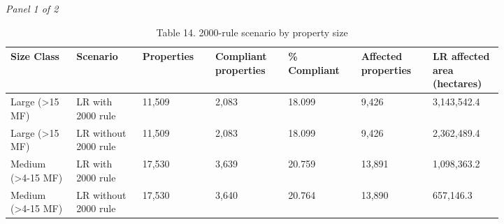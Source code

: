 \documentclass[12pt]{article}
\begin{document}
\begin{landscape}
\begin{table}[H]
\centering
\caption{Table 14. 2000-rule scenario by property size}
\textit{Panel 1 of 2}\\[2pt]
{\fontsize{12}{14}\selectfont
\setlength{\tabcolsep}{3pt}
\renewcommand{\arraystretch}{1.08}
\begin{tabular}{p{0.117\linewidth}p{0.117\linewidth}p{0.117\linewidth}p{0.117\linewidth}p{0.117\linewidth}p{0.117\linewidth}p{0.117\linewidth}}
\toprule
Size Class & Scenario & Properties & Compliant properties & \% Compliant & Affected properties & LR affected area (hectares) \\
\midrule
Large (>15 MF) & LR with 2000 rule & 11,509 & 2,083 & 18.099 & 9,426 & 3,143,542.4 \\
Large (>15 MF) & LR without 2000 rule & 11,509 & 2,083 & 18.099 & 9,426 & 2,362,489.4 \\
Medium (>4-15 MF) & LR with 2000 rule & 17,530 & 3,639 & 20.759 & 13,891 & 1,098,363.2 \\
Medium (>4-15 MF) & LR without 2000 rule & 17,530 & 3,640 & 20.764 & 13,890 & 657,146.3 \\
\bottomrule
\end{tabular}
}

\vspace{0.6em}


\end{table}
\end{landscape}
\end{document}
